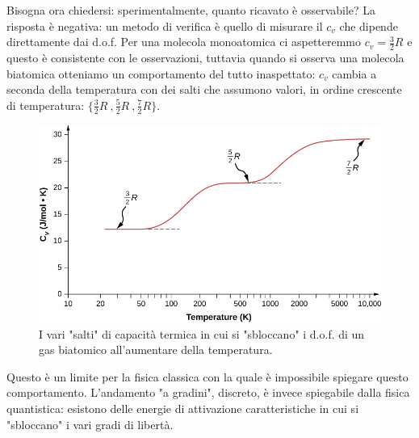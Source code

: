 \documentclass[
10pt, %
a4paper, %
oneside, %
headinclude,footinclude, %
BCOR5mm, %
]{scrartcl}
\begin{document}
Bisogna ora chiedersi: sperimentalmente, quanto ricavato è osservabile? La risposta è negativa: un metodo di verifica è quello di misurare il $c_v$ che dipende direttamente dai d.o.f. Per una molecola monoatomica ci aspetteremmo $c_v = \frac{3}{2} R$ e questo è consistente con le osservazioni, tuttavia quando si osserva una molecola biatomica otteniamo un comportamento del tutto inaspettato: $c_v$ cambia a seconda della temperatura con dei salti che assumono valori, in ordine crescente di temperatura: $\{\frac{3}{2}R\ , \frac{5}{2}R\ ,\frac{7}{2}R\}$. 
\begin{figure}[h!]
	\centering
	\includegraphics[width=0.6\linewidth]{../images/c_su_T_biatomiche}
	\caption{I vari "salti" di capacità termica in cui si "sbloccano" i d.o.f. di un gas biatomico all'aumentare della temperatura.}
	\label{fig:csutbiatomiche}
\end{figure}
\FloatBarrier
Questo è un limite per la fisica classica con la quale è impossibile spiegare questo comportamento. L'andamento "a gradini", discreto, è invece spiegabile dalla fisica quantistica: esistono delle energie di attivazione caratteristiche in cui si "sbloccano" i vari gradi di libertà. 
\FloatBarrier
\end{document}
